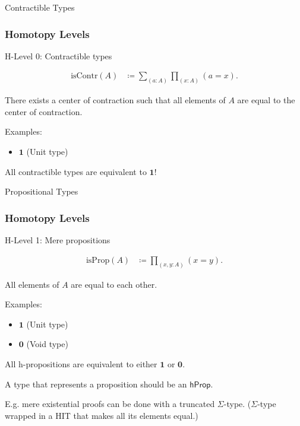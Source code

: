 \documentclass[9pt]{beamer}
\begin{document}
\begin{frame}{Contractible Types}
\frametitle{Homotopy Levels}

H-Level 0: Contractible types

\begin{align*}
  \text{isContr}(A) & \coloneqq \sum_{(a:A)} \prod_{(x:A)} (a = x).
\end{align*}

There exists a \alert{center of contraction} such that all elements of $A$ are equal to
the center of contraction.

Examples:
\begin{itemize}
  \item $\mathbf{1}$ (Unit type)
\end{itemize}

All contractible types are equivalent to $\mathbf{1}$!

\end{frame}

\begin{frame}{Propositional Types}
\frametitle{Homotopy Levels}

H-Level 1: Mere propositions

\begin{align*}
  \text{isProp}(A) & \coloneqq \prod_{(x,y:A)} (x = y).
\end{align*}

All elements of $A$ are equal to each other.

Examples:
\begin{itemize}
  \item $\mathbf{1}$ (Unit type)
  \item $\mathbf{0}$ (Void type)
\end{itemize}

All h-propositions are equivalent to either $\mathbf{1}$ or $\mathbf{0}$.

A type that represents a proposition should be an $\mathsf{hProp}$.

E.g. mere existential proofs can be done with a truncated $\Sigma$-type.
($\Sigma$-type wrapped in a HIT that makes all its elements equal.)

\end{frame}
\end{document}
